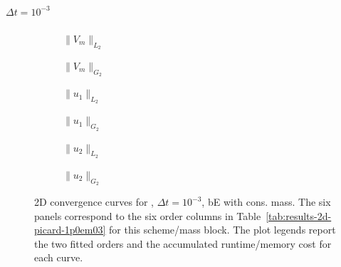 \paragraph{$\Delta t=10^{-3}$}

\begin{figure}[p]
\centering
\begin{subfigure}{0.485\linewidth}
\centering
{}
\caption{$\|V_m\|_{L_2}$}
\label{fig:results-2d-picard-1p0em03-backwardeuler-consistent-a}
\end{subfigure}
\hfill
\begin{subfigure}{0.485\linewidth}
\centering
{}
\caption{$\|V_m\|_{G_2}$}
\label{fig:results-2d-picard-1p0em03-backwardeuler-consistent-b}
\end{subfigure}
\par\vspace{0.8em}
\begin{subfigure}{0.485\linewidth}
\centering
{}
\caption{$\|u_1\|_{L_2}$}
\label{fig:results-2d-picard-1p0em03-backwardeuler-consistent-c}
\end{subfigure}
\hfill
\begin{subfigure}{0.485\linewidth}
\centering
{}
\caption{$\|u_1\|_{G_2}$}
\label{fig:results-2d-picard-1p0em03-backwardeuler-consistent-d}
\end{subfigure}
\par\vspace{0.8em}
\begin{subfigure}{0.485\linewidth}
\centering
{}
\caption{$\|u_2\|_{L_2}$}
\label{fig:results-2d-picard-1p0em03-backwardeuler-consistent-e}
\end{subfigure}
\hfill
\begin{subfigure}{0.485\linewidth}
\centering
{}
\caption{$\|u_2\|_{G_2}$}
\label{fig:results-2d-picard-1p0em03-backwardeuler-consistent-f}
\end{subfigure}
\caption{2D convergence curves for , $\Delta t=10^{-3}$, bE with cons. mass. The six panels correspond to the six order columns in Table~\ref{tab:results-2d-picard-1p0em03} for this scheme/mass block. The plot legends report the two fitted orders and the accumulated runtime/memory cost for each curve.}
\label{fig:results-2d-picard-1p0em03-backwardeuler-consistent}
\end{figure}
\FloatBarrier

